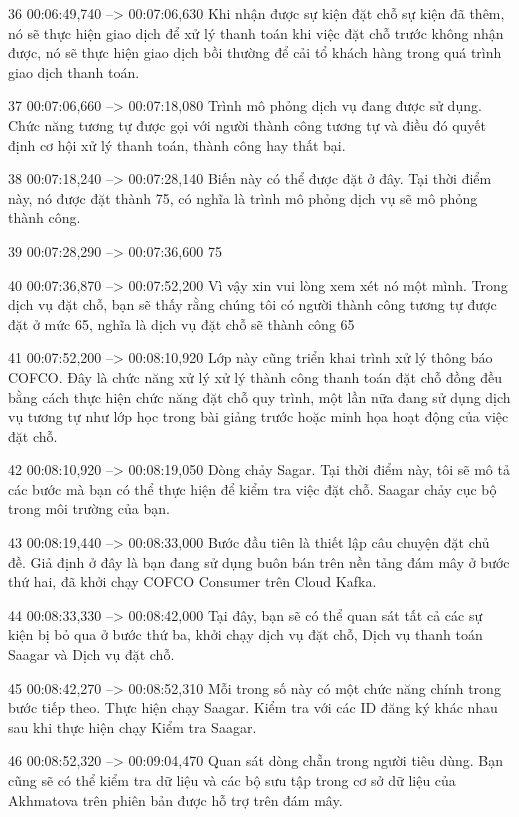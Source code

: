 36
00:06:49,740 --> 00:07:06,630
Khi nhận được sự kiện đặt chỗ sự kiện đã thêm, nó sẽ thực hiện giao dịch để xử lý thanh toán khi việc đặt chỗ trước không nhận được, nó sẽ thực hiện giao dịch bồi thường để cải tổ khách hàng trong quá trình giao dịch thanh toán.

37
00:07:06,660 --> 00:07:18,080
Trình mô phỏng dịch vụ đang được sử dụng.  Chức năng tương tự được gọi với người thành công tương tự và điều đó quyết định cơ hội xử lý thanh toán, thành công hay thất bại.

38
00:07:18,240 --> 00:07:28,140
Biến này có thể được đặt ở đây.  Tại thời điểm này, nó được đặt thành 75, có nghĩa là trình mô phỏng dịch vụ sẽ mô phỏng thành công.

39
00:07:28,290 --> 00:07:36,600
75%

40
00:07:36,870 --> 00:07:52,200
Vì vậy xin vui lòng xem xét nó một mình.  Trong dịch vụ đặt chỗ, bạn sẽ thấy rằng chúng tôi có người thành công tương tự được đặt ở mức 65, nghĩa là dịch vụ đặt chỗ sẽ thành công 65%

41
00:07:52,200 --> 00:08:10,920
Lớp này cũng triển khai trình xử lý thông báo COFCO.  Đây là chức năng xử lý xử lý thành công thanh toán đặt chỗ đồng đều bằng cách thực hiện chức năng đặt chỗ quy trình, một lần nữa đang sử dụng dịch vụ tương tự như lớp học trong bài giảng trước hoặc minh họa hoạt động của việc đặt chỗ.

42
00:08:10,920 --> 00:08:19,050
Dòng chảy Sagar.  Tại thời điểm này, tôi sẽ mô tả các bước mà bạn có thể thực hiện để kiểm tra việc đặt chỗ.  Saagar chảy cục bộ trong môi trường của bạn.

43
00:08:19,440 --> 00:08:33,000
Bước đầu tiên là thiết lập câu chuyện đặt chủ đề.  Giả định ở đây là bạn đang sử dụng buôn bán trên nền tảng đám mây ở bước thứ hai, đã khởi chạy COFCO Consumer trên Cloud Kafka.

44
00:08:33,330 --> 00:08:42,000
Tại đây, bạn sẽ có thể quan sát tất cả các sự kiện bị bỏ qua ở bước thứ ba, khởi chạy dịch vụ đặt chỗ, Dịch vụ thanh toán Saagar và Dịch vụ đặt chỗ.

45
00:08:42,270 --> 00:08:52,310
Mỗi trong số này có một chức năng chính trong bước tiếp theo.  Thực hiện chạy Saagar.  Kiểm tra với các ID đăng ký khác nhau sau khi thực hiện chạy Kiểm tra Saagar.

46
00:08:52,320 --> 00:09:04,470
Quan sát dòng chẵn trong người tiêu dùng.  Bạn cũng sẽ có thể kiểm tra dữ liệu và các bộ sưu tập trong cơ sở dữ liệu của Akhmatova trên phiên bản được hỗ trợ trên đám mây.

